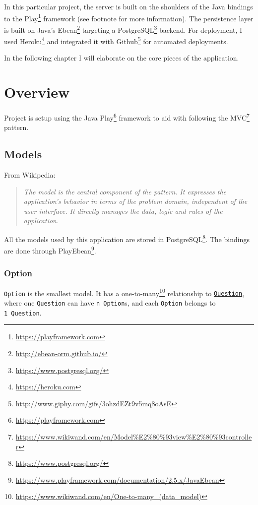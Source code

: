 \documentclass[english,a4paper,]{report}
\renewcommand{\href}[2]{#2\footnote{\url{#1}}}
\begin{document}
In this particular project, the server is built on the shoulders of the
Java bindings to the \href{https://playframework.com}{Play} framework
(see footnote for more information). The persistence layer is built on
Java's \href{http://ebean-orm.github.io/}{Ebean} targeting a
\href{https://www.postgresql.org/}{PostgreSQL} backend. For deployment,
I used \href{https://heroku.com}{Heroku} and integrated it with
Github\footnote{http://www.giphy.com/gifs/3ohzdEZt9v5mq8oAsE} for
automated deployments.

In the following chapter I will elaborate on the core pieces of the
application.

\chapter{Overview}\label{overview}

Project is setup using the Java \href{https://playframework.com}{Play}
framework to aid with following the
\href{https://www.wikiwand.com/en/Model\%E2\%80\%93view\%E2\%80\%93controller}{MVC}
pattern.

\section{Models}\label{models}

From Wikipedia:

\begin{quote}
\emph{The model is the central component of the pattern. It expresses
the application's behavior in terms of the problem domain, independent
of the user interface. It directly manages the data, logic and rules of
the application.}
\end{quote}

All the models used by this application are stored in
\href{https://www.postgresql.org/}{PostgreSQL}. The bindings are done
through
\href{https://www.playframework.com/documentation/2.5.x/JavaEbean}{PlayEbean}.

\subsection{Option}\label{option}

\texttt{Option} is the smallest model. It has a
\href{https://www.wikiwand.com/en/One-to-many_(data_model)}{one-to-many}
relationship to \protect\hyperlink{question}{\texttt{Question}}, where
one \texttt{Question} can have \texttt{n\ Option}s, and each
\texttt{Option} belongs to \texttt{1\ Question}.
\end{document}
